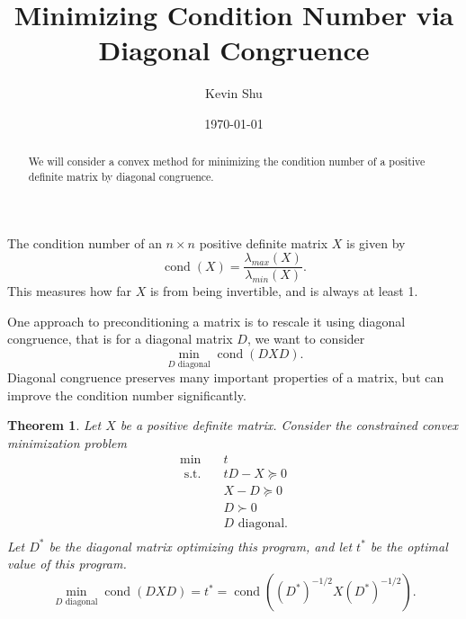 \documentclass{amsart}
\title{Minimizing Condition Number via Diagonal Congruence}
\date{\today}
\author{Kevin Shu}
\newtheorem{theorem}{Theorem}[section]
\theoremstyle{definition}
\DeclareMathOperator{\cond}{cond}
\newcommand{\st}{{\text{ s.t. }}}
\begin{document}
\begin{abstract}
    We will consider a convex method for minimizing the condition number of a positive definite matrix by diagonal congruence.
\end{abstract}

\maketitle
The condition number of an $n\times n$ positive definite matrix $X$ is given by
\[
    \cond(X) = \frac{\lambda_{max}(X)}{\lambda_{min}(X)}.
\]
This measures how far $X$ is from being invertible, and is always at least 1.

One approach to preconditioning a matrix is to rescale it using diagonal congruence, that is for a diagonal matrix $D$, we want to consider 
\[
    \min_{D \text{ diagonal}}\cond(DXD).
\]
Diagonal congruence preserves many important properties of a matrix, but can improve the condition number significantly.
\begin{theorem}
    Let $X$ be a positive definite matrix. Consider the constrained convex minimization problem
    \begin{equation}
        \label{eq:opt1}
        \begin{aligned}
            \min\quad & t\\
            \st &tD - X \succeq 0\\
                &X - D \succeq 0\\
                &D \succ 0\\
                &D \text{ diagonal}.\\
        \end{aligned}
    \end{equation}
    Let $D^*$ be the diagonal matrix optimizing this program, and let $t^*$ be the optimal value of this program.
    \[
        \min_{D \text{ diagonal}}\cond(DXD) = t^* = \cond((D^*)^{-1/2}X(D^*)^{-1/2}).
    \]
\end{theorem}
\end{document}
